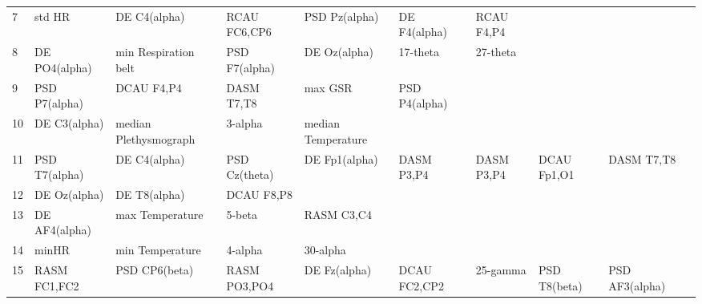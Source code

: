 \begin{landscape}
\begin{table}[]
\begin{tabular}{l|llllllll}
7        & std HR                & DE C4(alpha)          & RCAU FC6,CP6         & PSD Pz(alpha)           & DE F4(alpha)            & RCAU F4,P4           &                      &                       &                       &                    \\
8        & DE PO4(alpha)         & min Respiration belt  & PSD F7(alpha)        & DE Oz(alpha)            & 17-theta                & 27-theta             &                      &                       &                       &                    \\
9        & PSD P7(alpha)         & DCAU F4,P4            & DASM T7,T8           & max GSR                 & PSD P4(alpha)           &                      &                      &                       &                       &                    \\
10       & DE C3(alpha)          & median Plethysmograph & 3-alpha              & median Temperature      &                         &                      &                      &                       &                       &                    \\
11       & PSD T7(alpha)         & DE C4(alpha)          & PSD Cz(theta)        & DE Fp1(alpha)           & DASM P3,P4              & DASM P3,P4           & DCAU Fp1,O1          & DASM T7,T8            &                       &                    \\
12       & DE Oz(alpha)          & DE T8(alpha)          & DCAU F8,P8           &                         &                         &                      &                      &                       &                       &                    \\
13       & DE AF4(alpha)         & max Temperature       & 5-beta               & RASM C3,C4              &                         &                      &                      &                       &                       &                    \\
14       & minHR                 & min Temperature       & 4-alpha              & 30-alpha                &                         &                      &                      &                       &                       &                    \\
15       & RASM FC1,FC2          & PSD CP6(beta)         & RASM PO3,PO4         & DE Fz(alpha)            & DCAU FC2,CP2            & 25-gamma             & PSD T8(beta)         & PSD AF3(alpha)        &                       &                    \\

\end{tabular}
\end{table}
\end{landscape}
